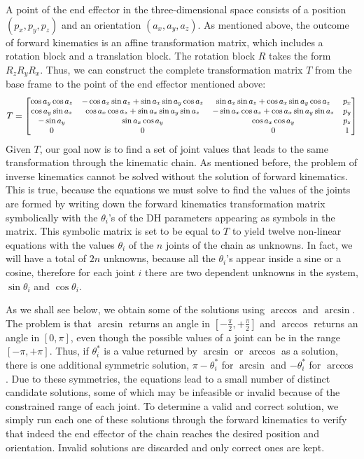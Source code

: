 A point of the end effector in the three-dimensional space consists of a position $(p_x,p_y,p_z)$ and an orientation $(a_x,a_y,a_z)$. As mentioned above, the outcome of forward kinematics is an affine transformation matrix, which includes a rotation block and a translation block. The rotation block $R$ takes the form $R_zR_yR_x$. Thus, we can construct the complete transformation matrix $T$ from the base frame to the point of the end effector mentioned above:
\[
\begin{small}
T = 
\begin{bmatrix}
\cos a_y\cos a_z & -\cos a_x\sin a_z + \sin a_x\sin a_y\cos a_z & \sin a_x\sin a_z + \cos a_x\sin a_y\cos a_z & p_x\\
\cos a_y\sin a_z & \cos a_x\cos a_z + \sin a_x\sin a_y\sin a_z & -\sin a_x\cos a_z + \cos a_x\sin a_y\sin a_z & p_y\\
-\sin a_y & \sin a_x\cos a_y & \cos a_x\cos a_y & p_z\\
0 & 0 & 0 & 1
\end{bmatrix}
\end{small}
\]
Given $T$, our goal now is to find a set of joint values that leads to the same transformation through the kinematic chain. As mentioned before, the problem of inverse kinematics cannot be solved without the solution of forward kinematics. This is true, because the equations we must solve to find the values of the joints are formed by writing down the forward kinematics transformation matrix symbolically with the $\theta_i$'s of the DH parameters appearing as symbols in the matrix. This symbolic matrix is set to be equal to $T$ to yield twelve non-linear equations with the values $\theta_i$ of the $n$ joints of the chain as unknowns. In fact, we will have a total of $2n$ unknowns, because all the $\theta_i$'s appear inside a sine or a cosine, therefore for each joint $i$ there are two dependent unknowns in the system, $\sin\theta_i$ and $\cos\theta_i$.

As we shall see below, we obtain some of the solutions using $\arccos$ and $\arcsin$. The problem is that $\arcsin$ returns an angle in $\left[-\tfrac{\pi}{2},+\tfrac{\pi}{2}\right]$ and $\arccos$ returns an angle in $\left[0,\pi\right]$, even though the possible values of a joint can be in the range $\left[-\pi,+\pi\right]$. Thus, if $\theta^*_i$ is a value returned by $\arcsin$ or $\arccos$ as a solution, there is one additional symmetric solution, $\pi - \theta^*_i$ for $\arcsin$ and $-\theta^*_i$ for $\arccos$. Due to these symmetries, the equations lead to a small number of distinct candidate solutions, some of which may be infeasible or invalid because of the constrained range of each joint. To determine a valid and correct solution, we simply run each one of these solutions through the forward kinematics to verify that indeed the end effector of the chain reaches the desired position and orientation. Invalid solutions are discarded and only correct ones are kept. 


